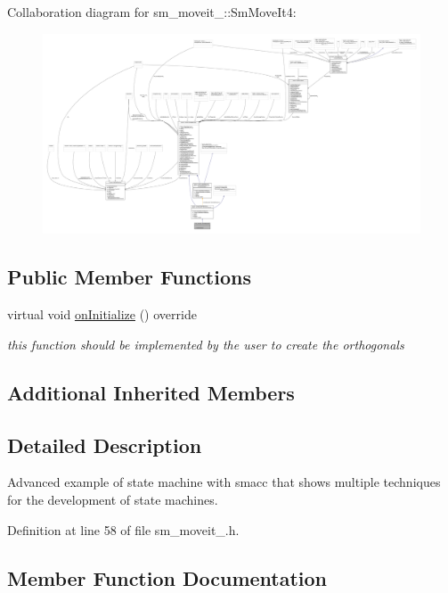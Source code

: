 Collaboration diagram for sm\+\_\+moveit\+\_\+:\+:Sm\+Move\+It4\+:
\nopagebreak
\begin{figure}[H]
\begin{center}
\leavevmode
\includegraphics[width=350pt]{structsm__moveit__4_1_1SmMoveIt4__coll__graph}
\end{center}
\end{figure}
\subsection*{Public Member Functions}
\begin{DoxyCompactItemize}
\item 
virtual void \hyperlink{structsm__moveit__4_1_1SmMoveIt4_a6a8149ada7bb62f89ccc514ad7408f15}{on\+Initialize} () override
\begin{DoxyCompactList}\small\item\em this function should be implemented by the user to create the orthogonals \end{DoxyCompactList}\end{DoxyCompactItemize}
\subsection*{Additional Inherited Members}


\subsection{Detailed Description}
Advanced example of state machine with smacc that shows multiple techniques for the development of state machines. 

Definition at line 58 of file sm\+\_\+moveit\+\_.\+h.



\subsection{Member Function Documentation}
\mbox{\label{structsm__moveit__4_1_1SmMoveIt4_a6a8149ada7bb62f89ccc514ad7408f15}} 
